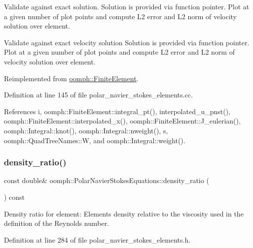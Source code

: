 Validate against exact solution. Solution is provided via function pointer. Plot at a given number of plot points and compute L2 error and L2 norm of velocity solution over element. 

Validate against exact velocity solution Solution is provided via function pointer. Plot at a given number of plot points and compute L2 error and L2 norm of velocity solution over element. 

Reimplemented from \hyperlink{classoomph_1_1FiniteElement_a73c79a1f1e5b1d334757812a6bbd58ff}{oomph\+::\+Finite\+Element}.



Definition at line 145 of file polar\+\_\+navier\+\_\+stokes\+\_\+elements.\+cc.



References i, oomph\+::\+Finite\+Element\+::integral\+\_\+pt(), interpolated\+\_\+u\+\_\+pnst(), oomph\+::\+Finite\+Element\+::interpolated\+\_\+x(), oomph\+::\+Finite\+Element\+::\+J\+\_\+eulerian(), oomph\+::\+Integral\+::knot(), oomph\+::\+Integral\+::nweight(), s, oomph\+::\+Quad\+Tree\+Names\+::W, and oomph\+::\+Integral\+::weight().

\mbox{\label{classoomph_1_1PolarNavierStokesEquations_ae67bc1e47d39854ade1e5ae6a83205b9}} 
\subsubsection{\texorpdfstring{density\+\_\+ratio()}{density\_ratio()}}
{\footnotesize\ttfamily const double\& oomph\+::\+Polar\+Navier\+Stokes\+Equations\+::density\+\_\+ratio (\begin{DoxyParamCaption}{ }\end{DoxyParamCaption}) const\hspace{0.3cm}{\ttfamily [inline]}}



Density ratio for element\+: Element\textquotesingle{}s density relative to the viscosity used in the definition of the Reynolds number. 



Definition at line 284 of file polar\+\_\+navier\+\_\+stokes\+\_\+elements.\+h.



